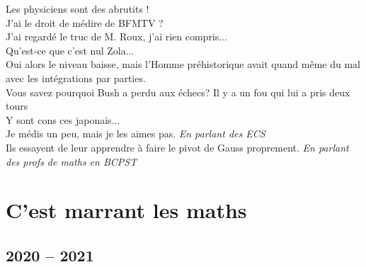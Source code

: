 \documentclass[french, a4paper, openany]{book}
\begin{document}
	\noindent \og Les physiciens sont des abrutits ! \fg \\
	\og J'ai le droit de médire de BFMTV ? \fg \\
	\og J'ai regardé le truc de M. Roux, j'ai rien compris... \fg \\
	\og Qu'est-ce que c'est nul Zola... \fg \\
	\og Oui alors le niveau baisse, mais l'Homme préhistorique avait quand même du mal avec les intégrations par parties. \fg \\
	\og Vous savez pourquoi Bush a perdu aux échecs? Il y a un fou qui lui a pris deux tours \fg \\
	\og Y sont cons ces japonais... \fg \\
	\og Je médis un peu, mais je les aimes pas. \fg \emph{En parlant des ECS}\\
	\og Ils essayent de leur apprendre à faire le pivot de Gauss proprement. \fg \emph{En parlant des profs de maths en BCPST} \\

\chapter{C'est marrant les maths}

\section{2020 -- 2021}
\end{document}
